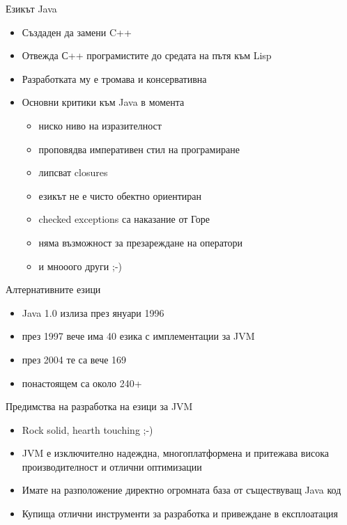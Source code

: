 \documentclass[compress,red]{beamer}
\begin{document}
\begin{frame}{Езикът Java}
  \transdissolve
    \begin{itemize}
      \item Създаден да замени C++ \pause
      \item Отвежда С++ програмистите до средата на пътя към Lisp \pause
      \item Разработката му е тромава и консервативна \pause
      \item Основни критики към Java в момента
        \begin{itemize}
          \item ниско ниво на изразителност \pause
          \item проповядва императивен стил на програмиране \pause
          \item липсват closures \pause
          \item езикът не е чисто обектно ориентиран \pause
          \item checked exceptions са наказание от Горе \pause
          \item няма възможност за презареждане на оператори \pause
          \item и мнооого други ;-)
        \end{itemize}
    \end{itemize}
\end{frame}

\begin{frame}{Алтернативните езици}
  \transdissolve
  \begin{itemize}
  \item Java 1.0 излиза през януари 1996 \pause
  \item през 1997 вече има 40 езика с имплементации за JVM \pause
  \item през 2004 те са вече 169 \pause
  \item понастоящем са около 240+ \pause
  \end{itemize}
\end{frame}

\begin{frame}{Предимства на разработка на езици за JVM}
  \transdissolve
  \begin{itemize}
  \item Rock solid, hearth touching ;-) \pause
  \item JVM е изключително надеждна, многоплатформена и притежава
    висока производителност и отлични оптимизации \pause
  \item Имате на разположение директно огромната база от съществуващ
    Java код  \pause
  \item Купища отлични инструменти за разработка и привеждане в
    експлоатация
  \end{itemize}
\end{frame}
\end{document}
